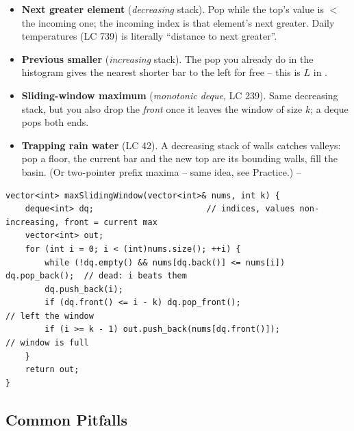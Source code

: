 \begin{itemize}[nosep]
  \item \textbf{Next greater element} (\emph{decreasing} stack). Pop while the top's value is $<$ the
        incoming one; the incoming index is that element's next greater. Daily temperatures
        (LC 739) is literally ``distance to next greater''. \hfill{}
  \item \textbf{Previous smaller} (\emph{increasing} stack). The pop you already do in the histogram
        gives the nearest shorter bar to the left for free -- this is $L$ in . \hfill{}
  \item \textbf{Sliding-window maximum} (\emph{monotonic deque}, LC 239). Same decreasing stack, but you
        also drop the \emph{front} once it leaves the window of size $k$; a deque pops both ends. \hfill{}
  \item \textbf{Trapping rain water} (LC 42). A decreasing stack of walls catches valleys: pop a floor,
        the current bar and the new top are its bounding walls, fill the basin. (Or two-pointer prefix
        maxima -- same idea, see Practice.) \hfill{}--
\end{itemize}

\begin{lstlisting}[caption={Sliding-window maximum with a monotonic deque (LeetCode 239) -- drop smaller from the back, out-of-window from the front}, label={lst:c26-deque}]
vector<int> maxSlidingWindow(vector<int>& nums, int k) {
    deque<int> dq;                       // indices, values non-increasing, front = current max
    vector<int> out;
    for (int i = 0; i < (int)nums.size(); ++i) {
        while (!dq.empty() && nums[dq.back()] <= nums[i]) dq.pop_back();  // dead: i beats them
        dq.push_back(i);
        if (dq.front() <= i - k) dq.pop_front();                          // left the window
        if (i >= k - 1) out.push_back(nums[dq.front()]);                  // window is full
    }
    return out;
}
\end{lstlisting}

\subsection{Common Pitfalls}\label{sec:c26-monostack-pitfalls}

